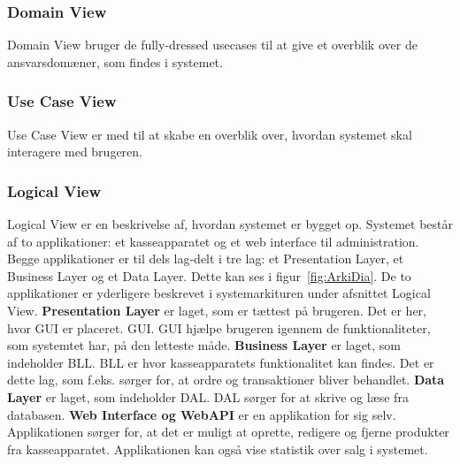 \subsubsection{Domain View}
Domain View bruger de fully-dressed \gls{usecase}s til at give et overblik over de ansvarsdomæner, som findes i systemet.

\subsubsection{Use Case View}
Use Case View er med til at skabe en overblik over, hvordan \gls{system}et skal interagere med brugeren.

\subsubsection{Logical View}
Logical View er en beskrivelse af, hvordan systemet er bygget op. Systemet består af to applikationer: et kasseapparatet og et web interface til administration. Begge applikationer er til dels lag-delt i tre lag: et Presentation Layer, et Business Layer og et Data Layer. Dette kan ses i figur~\ref{fig:ArkiDia}. De to applikationer er yderligere beskrevet i systemarkituren under afsnittet Logical View. 
\newline\newline
\textbf{Presentation Layer} er laget, som er tættest på brugeren. Det er her, hvor \gls{GUI} er placeret. \gls{GUI}. \gls{GUI} hjælpe brugeren igennem de funktionaliteter, som systemtet har, på den letteste måde.
\newline\newline
\textbf{Business Layer} er laget, som indeholder \gls{BLL}. \gls{BLL} er hvor kasseapparatets funktionalitet kan findes. Det er dette lag, som f.eks. sørger for, at ordre og transaktioner bliver behandlet.
\newline\newline
\textbf{Data Layer} er laget, som indeholder \gls{DAL}. \gls{DAL} sørger for at skrive og læse fra databasen.
\newline\newline
\textbf{Web Interface og WebAPI} er en applikation for sig selv. Applikationen sørger for, at det er muligt at oprette, redigere og fjerne produkter fra kasseapparatet. Applikationen kan også vise statistik over salg i systemet. 

